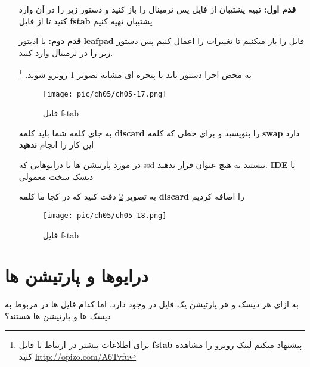 \begin{enumerate}
	\item[\textbf{قدم اول:}] تهیه پشتیبان از فایل
	پس ترمینال را باز کنید و دستور زیر را در آن وارد کنید تا از فایل
	\textbf{fstab}
	پشتیبان تهیه کنیم
	
			\item[\textbf{قدم دوم:}] 
			با ادیتور
			\textbf{leafpad}
			فایل را باز میکنیم تا تغییرات را اعمال کنیم پس دستور زیر را در ترمینال وارد کنید.
			
						
						به محض اجرا دستور باید با پنجره ای مشابه تصویر
						\ref{pic-53}
						روبرو شوید.
						\footnote{برای اطلاعات بیشتر در ارتباط با فایل
					\textbf{fstab}	
					پیشنهاد میکنم لینک روبرو را مشاهده کنید
					\href{http://www.linuxfedora.ir/fstab-t87.html}{http://opizo.com/A6Tvfu}
					}
						\begin{figure}[H]%
							\caption{فایل fstab}
							\begin{center}
								\texttt{[image: pic/ch05/ch05-17.png]}
							\end{center}
							\label{pic-53}
						\end{figure}
					به جای کلمه
					\textbf{}
					شما باید کلمه
					\textbf{discard}
					را بنویسید و برای خطی که کلمه
					\textbf{swap}
					دارد این کار را انجام
					\textbf{ندهید}
					\begin{tcolorbox}[title=هاردهای IDE]
						در مورد پارتیشن ها یا درایوهایی که ssd نیستند به هیچ عنوان قرار ندهید.
						\textbf{IDE}
						یا دیسک سخت معمولی
					\end{tcolorbox}
				به تصویر
				\ref{pic-54}
				دقت کنید که در کجا ما کلمه
									\textbf{discard}
									را اضافه کردیم
									\begin{figure}[H]%
										\caption{فایل fstab}
										\begin{center}
											\texttt{[image: pic/ch05/ch05-18.png]}
										\end{center}
										\label{pic-54}
									\end{figure}								
\end{enumerate}
\section{درایوها و پارتیشن ها}\label{se-45}
به ازای هر دیسک و هر پارتیشن یک فایل در 
\textbf{}
 وجود دارد. اما کدام فایل ها در
 \textbf{}
  مربوط به دیسک ها و پارتیشن ها هستند؟
  
